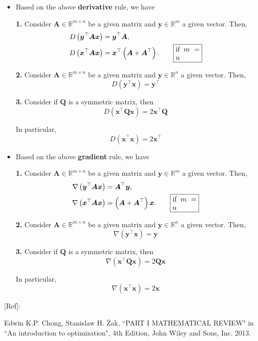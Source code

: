 \documentclass[12pt,thmsa]{article}
\begin{document}
\begin{itemize}
	\item Based on the above \textbf{derivative} rule, we have

	\textbf{1.} Consider \(\boldsymbol{A} \in \mathbb{R}^{m \times n}\) be a given matrix and \(\boldsymbol{y} \in \mathbb{R}^{m}\) a given vector. Then,
	\begin{align*}
		D\left(\boldsymbol{y}^{\top} \boldsymbol{A} \boldsymbol{x}\right) &=
		\boldsymbol{y}^{\top} \boldsymbol{A}, \\
		D\left(\boldsymbol{x}^{\top} \boldsymbol{A} \boldsymbol{x}\right) &=
		\boldsymbol{x}^{\top}\left(\boldsymbol{A}+\boldsymbol{A}^{\top}\right).  \qquad
		\fbox{\parbox{0.1\textwidth}{ if \(m=n\) }}
	\end{align*}
	
	
	\textbf{2.} Consider \(\boldsymbol{A} \in \mathbb{R}^{m \times n}\) be a given matrix and \(\boldsymbol{y} \in \mathbb{R}^{n}\) a given vector. Then,
	\[ D\left(\boldsymbol{y}^{\top} \boldsymbol{x}\right)=\boldsymbol{y}^{\top} \]
	
	\textbf{3.} Consider if \(\boldsymbol{Q}\) is a symmetric matrix, then
	\[
	D\left(\boldsymbol{x}^{\top} \boldsymbol{Q} \boldsymbol{x}\right)=2 \boldsymbol{x}^{\top} \boldsymbol{Q}
	\]
	
	In particular,
	\[
	D\left(\boldsymbol{x}^{\top} \boldsymbol{x}\right)=2 \boldsymbol{x}^{\top}
	\]

	\item Based on the above \textbf{gradient} rule, we have

	\textbf{1.} Consider \(\boldsymbol{A} \in \mathbb{R}^{m \times n}\) be a given matrix and \(\boldsymbol{y} \in \mathbb{R}^{m}\) a given vector. Then,
	\begin{align*}
		\nabla \left(\boldsymbol{y}^{\top} \boldsymbol{A} \boldsymbol{x}\right) &= \boldsymbol{A}^{\top} \boldsymbol{y}, \\
		\nabla  \left(\boldsymbol{x}^{\top} \boldsymbol{A} \boldsymbol{x}\right) &=
		\left(\boldsymbol{A}+\boldsymbol{A}^{\top}\right) \boldsymbol{x}.  \qquad
		\fbox{\parbox{0.1\textwidth}{ if \(m=n\) }}
	\end{align*}
	
	
	\textbf{2.} Consider \(\boldsymbol{A} \in \mathbb{R}^{m \times n}\) be a given matrix and \(\boldsymbol{y} \in \mathbb{R}^{n}\) a given vector. Then,
	\[ \nabla \left(\boldsymbol{y}^{\top} \boldsymbol{x}\right)=\boldsymbol{y} \]
	
	\textbf{3.} Consider if \(\boldsymbol{Q}\) is a symmetric matrix, then
	\[
	\nabla \left(\boldsymbol{x}^{\top} \boldsymbol{Q} \boldsymbol{x}\right)=2  \boldsymbol{Q} \boldsymbol{x}
	\]
	
	In particular,
	\[
	\nabla \left(\boldsymbol{x}^{\top} \boldsymbol{x}\right)=2 \boldsymbol{x}
	\]

\end{itemize}

\bigskip

\noindent

[Ref]: 

Edwin K.P. Chong, Stanislaw H. Żak, ``PART I MATHEMATICAL REVIEW" in ``An introduction to optimization", 4th Edition, John Wiley and Sons, Inc. 2013.
\end{document}
